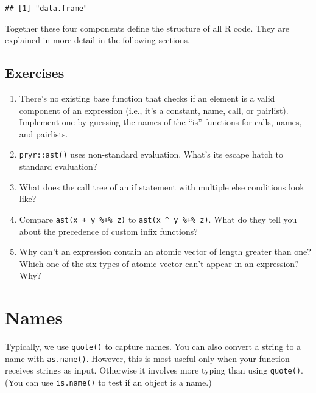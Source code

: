 \begin{verbatim}
## [1] "data.frame"
\end{verbatim}

Together these four components define the structure of all R code. They
are explained in more detail in the following sections.

\hypertarget{exercises}{%
\subsection{Exercises}\label{exercises}}

\begin{enumerate}
\def\labelenumi{\arabic{enumi}.}
\item
  There's no existing base function that checks if an element is a valid
  component of an expression (i.e., it's a constant, name, call, or
  pairlist). Implement one by guessing the names of the ``is'' functions
  for calls, names, and pairlists.
\item
  \texttt{pryr::ast()} uses non-standard evaluation. What's its escape
  hatch to standard evaluation?
\item
  What does the call tree of an if statement with multiple else
  conditions look like?
\item
  Compare \texttt{ast(x\ +\ y\ \%+\%\ z)} to
  \texttt{ast(x\ \^{}\ y\ \%+\%\ z)}. What do they tell you about the
  precedence of custom infix functions?
\item
  Why can't an expression contain an atomic vector of length greater
  than one? Which one of the six types of atomic vector can't appear in
  an expression? Why?
\end{enumerate}

\hypertarget{names}{%
\section{Names}\label{names}}

Typically, we use \texttt{quote()} to capture names. You can also
convert a string to a name with \texttt{as.name()}. However, this is
most useful only when your function receives strings as input. Otherwise
it involves more typing than using \texttt{quote()}. (You can use
\texttt{is.name()} to test if an object is a name.) 

\begin{Shaded}
\begin{Highlighting}[]
\NormalTok{(}\NormalTok{)}
\end{Highlighting}
\end{Shaded}

